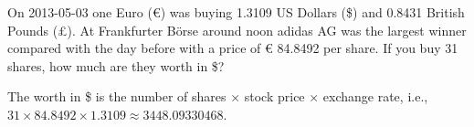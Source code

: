 
\begin{question}
On 2013-05-03 one Euro (€) was buying
1.3109 US Dollars (\$) and
0.8431 British Pounds (£).
At Frankfurter Börse around noon adidas AG was the largest winner
compared with the day before with a price of
€ 84.8492 per share.
If you buy 31 shares, how much are they worth in
\$?
\end{question}

\begin{solution}
The worth in \$ is the
number of shares $\times$ stock price $\times$ exchange rate, i.e.,
$31 \times 84.8492 \times 1.3109 \approx 3448.09330468$.
\end{solution}

